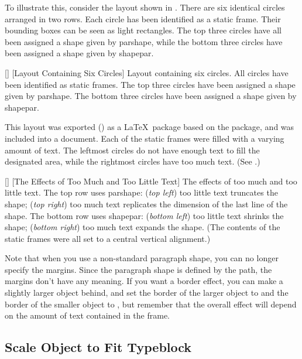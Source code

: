 To illustrate this, consider the layout shown in 
. There are six identical circles
arranged in two rows. Each circle has been identified as a static
frame. Their bounding boxes can be seen as light  rectangles.
The top three circles have all been assigned a shape given by
\gls{parshape}, while the bottom three circles have been
assigned a shape given by \gls{shapepar}.

[]
{}
[Layout Containing Six Circles]
{Layout containing six circles. All circles have been
identified as static frames. The top three circles have been
assigned a shape given by \gls{parshape}. The bottom
three circles have been assigned a shape given by
\gls{shapepar}.}

This layout was exported () as a \LaTeX\
package based on the  package, and was included
into a document. Each of the static frames were filled with a
varying amount of text.  The leftmost circles do not have enough
text to fill the designated area, while the rightmost circles have
too much text.  (See \figureref{fig:parshape-poster2}.)

[]
{}
[The Effects of Too Much and Too Little Text]
{The effects of too much and too little text. The top row uses
\gls{parshape}: (\emph{top left}) too little text truncates
the shape; (\emph{top right}) too much text replicates the dimension
of the last line of the shape. The bottom row uses
\gls{shapepar}: (\emph{bottom left}) too little text shrinks
the shape; (\emph{bottom right}) too much text expands the shape.
(The contents of the static frames were all set to a central
vertical alignment.)}

Note that when you use a non-standard paragraph shape, you can
no longer specify the margins. Since the paragraph shape is defined
by the \gls{path}, the margins don't have any meaning. If you want
a border effect, you can make a slightly larger object behind, and
set the border of the larger object to
 and the border of the
smaller object to , but
remember that the overall effect will depend on the amount of text
contained in the frame.

\subsection{Scale Object to Fit Typeblock}\label{sec:scaletotypeblock}

